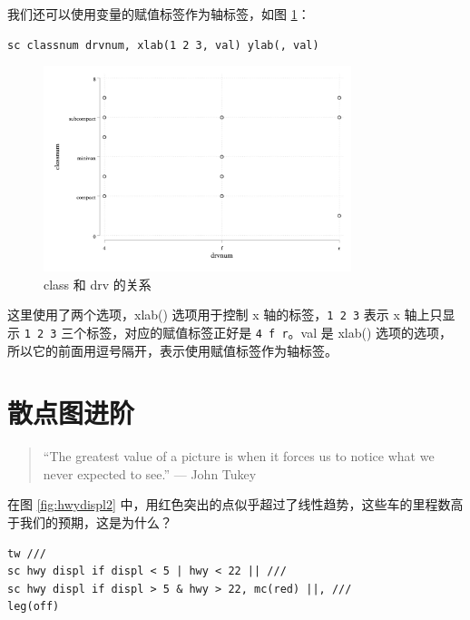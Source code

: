 \documentclass[]{ctexbook}
\begin{document}
我们还可以使用变量的赋值标签作为轴标签，如图 \ref{fig:classnumdrvnum2}：

\begin{lstlisting}
sc classnum drvnum, xlab(1 2 3, val) ylab(, val)
\end{lstlisting}

\begin{figure}

{\centering \includegraphics[width=0.8\textwidth]{assets/classnumdrvnum2} 

}

\caption{class 和 drv 的关系}\label{fig:classnumdrvnum2}
\end{figure}

这里使用了两个选项，xlab() 选项用于控制 x 轴的标签，\texttt{1\ 2\ 3} 表示 x 轴上只显示 \texttt{1\ 2\ 3} 三个标签，对应的赋值标签正好是 \texttt{4\ f\ r}。val 是 xlab() 选项的选项，所以它的前面用逗号隔开，表示使用赋值标签作为轴标签。

\hypertarget{section-31}{%
\section{散点图进阶}\label{section-31}}

\begin{quote}
``The greatest value of a picture is when it forces us to notice what we never expected to see.'' --- John Tukey
\end{quote}

在图 \ref{fig:hwydispl2} 中，用红色突出的点似乎超过了线性趋势，这些车的里程数高于我们的预期，这是为什么？

\begin{lstlisting}
tw ///
sc hwy displ if displ < 5 | hwy < 22 || ///
sc hwy displ if displ > 5 & hwy > 22, mc(red) ||, ///
leg(off)
\end{lstlisting}
\end{document}

